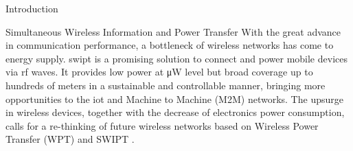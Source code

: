\begin{section}{Introduction}
	\begin{subsection}{Simultaneous Wireless Information and Power Transfer}
		With the great advance in communication performance, a bottleneck of wireless networks has come to energy supply. \gls{swipt} is a promising solution to connect and power mobile devices via \gls{rf} waves. It provides low power at \si{\uW} level but broad coverage up to hundreds of meters in a sustainable and controllable manner, bringing more opportunities to the \gls{iot} and Machine to Machine (M2M) networks. The upsurge in wireless devices, together with the decrease of electronics power consumption, calls for a re-thinking of future wireless networks based on Wireless Power Transfer (WPT) and SWIPT \cite{Clerckx2019}.

\end{subsection}
\end{section}
